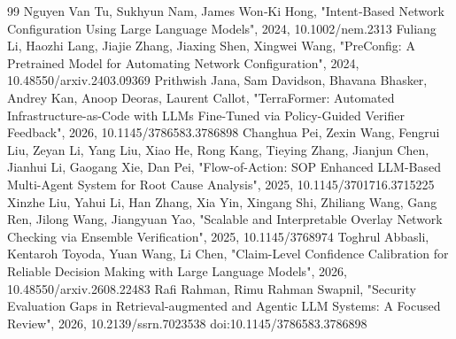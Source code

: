 \documentclass[conference]{IEEEtran}
\begin{document}
\begin{thebibliography}{99}
 Nguyen Van Tu, Sukhyun Nam, James Won‐Ki Hong, "Intent‐Based Network Configuration Using Large Language Models", 2024, 10.1002/nem.2313
 Fuliang Li, Haozhi Lang, Jiajie Zhang, Jiaxing Shen, Xingwei Wang, "PreConfig: A Pretrained Model for Automating Network Configuration", 2024, 10.48550/arxiv.2403.09369
 Prithwish Jana, Sam Davidson, Bhavana Bhasker, Andrey Kan, Anoop Deoras, Laurent Callot, "TerraFormer: Automated Infrastructure-as-Code with LLMs Fine-Tuned via Policy-Guided Verifier Feedback", 2026, 10.1145/3786583.3786898
 Changhua Pei, Zexin Wang, Fengrui Liu, Zeyan Li, Yang Liu, Xiao He, Rong Kang, Tieying Zhang, Jianjun Chen, Jianhui Li, Gaogang Xie, Dan Pei, "Flow-of-Action: SOP Enhanced LLM-Based Multi-Agent System for Root Cause Analysis", 2025, 10.1145/3701716.3715225
 Xinzhe Liu, Yahui Li, Han Zhang, Xia Yin, Xingang Shi, Zhiliang Wang, Gang Ren, Jilong Wang, Jiangyuan Yao, "Scalable and Interpretable Overlay Network Checking via Ensemble Verification", 2025, 10.1145/3768974
 Toghrul Abbasli, Kentaroh Toyoda, Yuan Wang, Li Chen, "Claim-Level Confidence Calibration for Reliable Decision Making with Large Language Models", 2026, 10.48550/arxiv.2608.22483
 Rafi Rahman, Rimu Rahman Swapnil, "Security Evaluation Gaps in Retrieval-augmented and Agentic LLM Systems: A Focused Review", 2026, 10.2139/ssrn.7023538
 doi:10.1145/3786583.3786898
\end{thebibliography}
\end{document}
